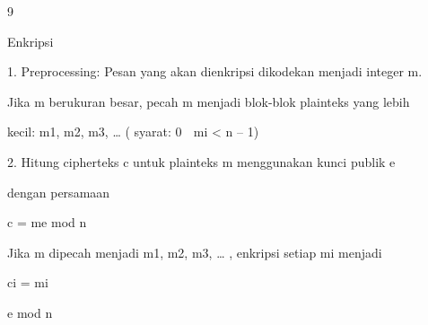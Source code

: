\documentclass{article}
\begin{document}

9

Enkripsi 

1. Preprocessing: Pesan yang akan dienkripsi dikodekan menjadi integer m. 

Jika m berukuran besar, pecah m menjadi blok-blok plainteks yang lebih 

kecil: m1, m2,  m3, …  ( syarat: 0  mi  < n – 1)

2. Hitung cipherteks c untuk plainteks m menggunakan  kunci publik e 

dengan persamaan 

                   c = me mod n

     Jika m dipecah menjadi m1, m2,  m3, … , enkripsi setiap mi menjadi

               ci = mi

e mod n
\end{document}
